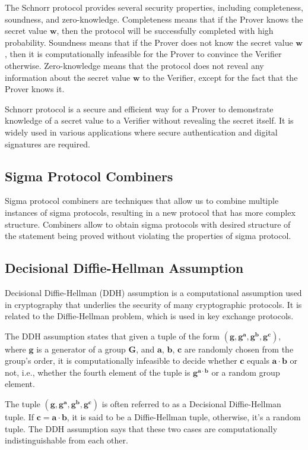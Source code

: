The Schnorr protocol provides several security properties, including completeness, soundness, and zero-knowledge. Completeness means that if the Prover knows the secret value $\boldsymbol{w}$, then the protocol will be successfully completed with high probability. Soundness means that if the Prover does not know the secret value $\boldsymbol{w}$, then it is computationally infeasible for the Prover to convince the Verifier otherwise. Zero-knowledge means that the protocol does not reveal any information about the secret value $\boldsymbol{w}$ to the Verifier, except for the fact that the Prover knows it.

Schnorr protocol is a secure and efficient way for a Prover to demonstrate knowledge of a secret value to a Verifier without revealing the secret itself. It is widely used in various applications where secure authentication and digital signatures are required.

\subsection{Sigma Protocol Combiners}
Sigma protocol combiners are techniques that allow us to combine multiple instances of sigma protocols, resulting in a new protocol that has more complex structure. Combiners allow to obtain sigma protocols with desired structure of the statement being proved without violating the properties of sigma protocol. 

\subsection{Decisional Diffie-Hellman Assumption}
Decisional Diffie-Hellman (DDH) assumption is a computational assumption used in cryptography that underlies the security of many cryptographic protocols. It is related to the Diffie-Hellman problem, which is used in key exchange protocols.

The DDH assumption states that given a tuple of the form $(\mathbf{g}, \mathbf{g}^\mathbf{a}, \mathbf{g}^\mathbf{b}, \mathbf{g}^\mathbf{c})$, where $\mathbf{g}$ is a generator of a group $\mathbf{G}$, and $\mathbf{a}$, $\mathbf{b}$, $\mathbf{c}$ are randomly chosen from the group's order, it is computationally infeasible to decide whether $\mathbf{c}$ equals $\mathbf{a} \cdot \mathbf{b}$ or not, i.e., whether the fourth element of the tuple is $\mathbf{g}^{\mathbf{a} \cdot \mathbf{b}}$ or a random group element.

The tuple $(\mathbf{g}, \mathbf{g}^\mathbf{a}, \mathbf{g}^\mathbf{b}, \mathbf{g}^\mathbf{c})$ is often referred to as a Decisional Diffie-Hellman tuple. If $\mathbf{c} = \mathbf{a} \cdot \mathbf{b}$, it is said to be a Diffie-Hellman tuple, otherwise, it's a random tuple. The DDH assumption says that these two cases are computationally indistinguishable from each other.

